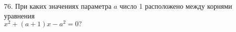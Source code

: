 76. При каких значениях параметра $a$ число 1 расположено между корнями уравнения \\$x^2+(a+1)x-a^2=0?$\\
